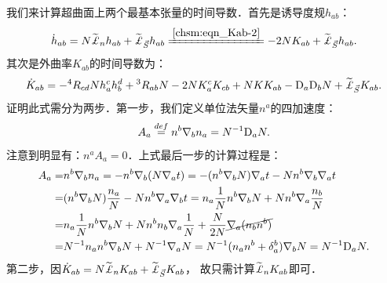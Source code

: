 

我们来计算超曲面上两个最基本张量的时间导数．首先是诱导度规$h_{ab}$：
\begin{equation}\label{chsm:eqn_Lie-t-hab}
    \dot{h}_{ab} = N \widetilde{\Lie}_{n}{h}_{ab}
    +\widetilde{\Lie}_{\vec{S}}{h}_{ab}
    \xlongequal{\ref{chsm:eqn_Kab-2}}
    -2N K_{ab}
    +\widetilde{\Lie}_{\vec{S}}{h}_{ab} .
\end{equation}
其次是外曲率$K_{ab}$的时间导数为：
\setlength{\mathindent}{0em}
\begin{equation}\label{chsm:eqn_Lie-t-Kab}
    \dot{K}_{ab} = -{}^4 R_{cd} N h^c_a h^d_b + {}^3 R_{ab} N - 2N K^c_a K_{cb}
     + N K K_{ab} - {\rm D}_a {\rm D}_b N +\widetilde{\Lie}_{\vec{S}}{K}_{ab}.
\end{equation}\setlength{\mathindent}{2em}
证明此式需分为两步．第一步，我们定义{\heiti 单位法矢量$n^a$的四加速度}：
\begin{equation}\label{chsm:eqn_Acceleration}
    A_a \overset{def}{=} n^b \nabla_b n_a =N^{-1} {\rm D}_a N .
\end{equation}
注意到明显有：$n^a A_a =0 $．上式最后一步的计算过程是：  %
\begin{align*}
    A_a =& n^b \nabla_b n_a = -n^b\nabla_b ( N \nabla_a t )
    = -(n^b\nabla_b  N) \nabla_a t  -  N n^b\nabla_b  \nabla_a t \\
    =& (n^b\nabla_b  N) \frac{n_a}{N} -  N n^b\nabla_a  \nabla_b t 
    = n_a \frac{1}{N} n^b\nabla_b N   +  N n^b\nabla_a  \frac{n_b}{N}  \\
    =& n_a \frac{1}{N} n^b\nabla_b N + N n^b n_b \nabla_a \frac{1}{N} 
    +  \frac{N}{2N} {\cancel{\nabla_a  (n_bn^b)}} \\
    =& N^{-1} n_a n^b\nabla_b N + N^{-1} \nabla_a N
    = N^{-1} (n_a n^b + \delta^b_a )\nabla_b N
    =N^{-1} {\rm D}_a N .
\end{align*} %
第二步，因$\dot{K}_{ab} = N \widetilde{\Lie}_{n}{K}_{ab} +\widetilde{\Lie}_{\vec{S}}{K}_{ab}$，
故只需计算$\widetilde{\Lie}_{n}{K}_{ab}$即可．

